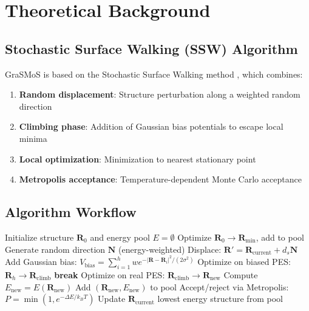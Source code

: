 \documentclass[11pt,a4paper]{article}
\begin{document}
\section{Theoretical Background}

\subsection{Stochastic Surface Walking (SSW) Algorithm}
GraSMoS is based on the Stochastic Surface Walking method \cite{shang2013ssw}, which combines:

\begin{enumerate}
    \item \textbf{Random displacement}: Structure perturbation along a weighted random direction
    \item \textbf{Climbing phase}: Addition of Gaussian bias potentials to escape local minima
    \item \textbf{Local optimization}: Minimization to nearest stationary point
    \item \textbf{Metropolis acceptance}: Temperature-dependent Monte Carlo acceptance
\end{enumerate}

\subsection{Algorithm Workflow}

\begin{algorithm}
\caption{GraSMoS Search Algorithm}
\begin{algorithmic}[1]
\State Initialize structure $\mathbf{R}_0$ and energy pool $E = \emptyset$
\State Optimize $\mathbf{R}_0 \rightarrow \mathbf{R}_{\text{min}}$, add to pool
    \State Generate random direction $\mathbf{N}$ (energy-weighted)
    \State Displace: $\mathbf{R}' = \mathbf{R}_{\text{current}} + d_s \mathbf{N}$
        \State Add Gaussian bias: $V_{\text{bias}} = \sum_{i=1}^{h} w e^{-|\mathbf{R} - \mathbf{R}_i|^2 / (2\sigma^2)}$
        \State Optimize on biased PES: $\mathbf{R}_h \rightarrow \mathbf{R}_{\text{climb}}$
            \State \textbf{break}
        \EndIf
    \EndFor
    \State Optimize on real PES: $\mathbf{R}_{\text{climb}} \rightarrow \mathbf{R}_{\text{new}}$
    \State Compute $E_{\text{new}} = E(\mathbf{R}_{\text{new}})$
        \State Add $(\mathbf{R}_{\text{new}}, E_{\text{new}})$ to pool
    \EndIf
    \State Accept/reject via Metropolis: $P = \min(1, e^{-\Delta E / k_B T})$
    \State Update $\mathbf{R}_{\text{current}}$
\EndFor
\State \Return lowest energy structure from pool
\end{algorithmic}
\end{algorithm}
\end{document}
